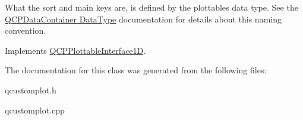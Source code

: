 What the sort and main keys are, is defined by the plottable\textquotesingle{}s data type. See the \hyperlink{classQCPDataContainer_qcpdatacontainer-datatype}{Q\+C\+P\+Data\+Container Data\+Type} documentation for details about this naming convention. 

Implements \hyperlink{classQCPPlottableInterface1D_a229e65e7ab968dd6cd0e259fa504b79d}{Q\+C\+P\+Plottable\+Interface1D}.



The documentation for this class was generated from the following files\+:\begin{DoxyCompactItemize}
\item 
qcustomplot.\+h\item 
qcustomplot.\+cpp\end{DoxyCompactItemize}
